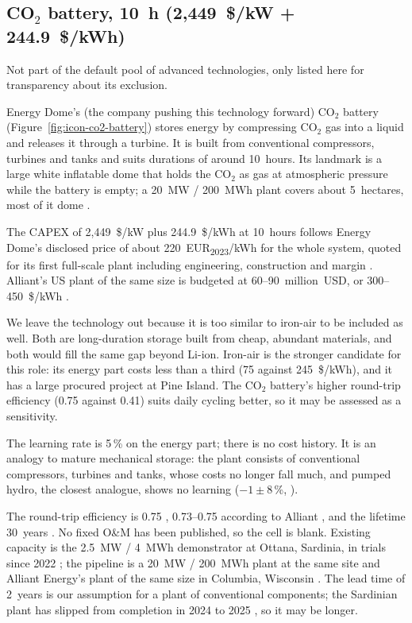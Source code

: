 \subsection{CO$_2$ battery, 10~h (2,449~\$/kW + 244.9~\$/kWh)}\label{sec:co2-battery}
Not part of the default pool of advanced technologies, only listed here for transparency about its exclusion.

Energy Dome's (the company pushing this technology forward) CO$_2$ battery (Figure~\ref{fig:icon-co2-battery}) stores energy by compressing CO$_2$ gas into a liquid and releases it through a turbine.
It is built from conventional compressors, turbines and tanks and suits durations of around 10~hours.
Its landmark is a large white inflatable dome that holds the CO$_2$ as gas at atmospheric pressure while the battery is empty; a 20~MW / 200~MWh plant covers about 5~hectares, most of it dome \citep{utilitydive2024}.

The CAPEX of 2,449~\$/kW plus 244.9~\$/kWh at 10~hours follows Energy Dome's disclosed price of about 220~EUR\textsubscript{2023}/kWh for the whole system, quoted for its first full-scale plant including engineering, construction and margin \citep{esn2023}.
Alliant's US plant of the same size is budgeted at 60--90~million~USD, or 300--450~\$/kWh \citep{utilitydive2024}.

We leave the technology out because it is too similar to iron-air to be included as well.
Both are long-duration storage built from cheap, abundant materials, and both would fill the same gap beyond Li-ion.
Iron-air is the stronger candidate for this role: its energy part costs less than a third (75 against 245~\$/kWh), and it has a large procured project at Pine Island.
The CO$_2$ battery's higher round-trip efficiency (0.75 against 0.41) suits daily cycling better, so it may be assessed as a sensitivity.

The learning rate is 5\,\% on the energy part; there is no cost history.
It is an analogy to mature mechanical storage: the plant consists of conventional compressors, turbines and tanks, whose costs no longer fall much, and pumped hydro, the closest analogue, shows no learning ($-1 \pm 8$\,\%, \citealp{schmidt2018}).

The round-trip efficiency is 0.75 \citep{esn2023}, 0.73--0.75 according to Alliant \citep{utilitydive2024}, and the lifetime 30~years \citep{energydome}.
No fixed O\&M has been published, so the cell is blank.
Existing capacity is the 2.5~MW / 4~MWh demonstrator at Ottana, Sardinia, in trials since 2022 \citep{mittr2022}; the pipeline is a 20~MW / 200~MWh plant at the same site and Alliant Energy's plant of the same size in Columbia, Wisconsin \citep{utilitydive2024}.
The lead time of 2~years is our assumption for a plant of conventional components; the Sardinian plant has slipped from completion in 2024 \citep{utilitydive2024} to 2025 \citep{engie2024}, so it may be longer.
